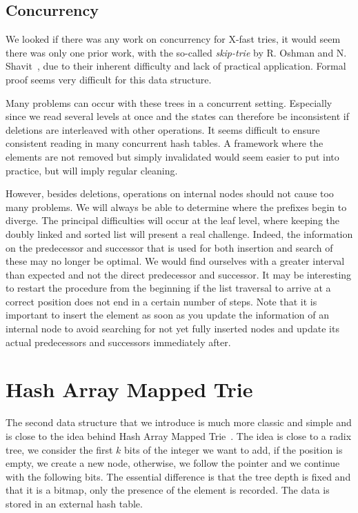 \documentclass[conference]{IEEEtran}
\begin{document}
\subsection{Concurrency}

We looked if there was any work on concurrency for X-fast tries, it would seem there was only one prior work, with the so-called \textit{skip-trie} by R. Oshman and N. Shavit~\cite{oshman2013skiptrie}, due to their inherent difficulty and lack of practical application. Formal proof seems very difficult for this data structure.

Many problems can occur with these trees in a concurrent setting. Especially since we read several levels at once and the states can therefore be inconsistent if deletions are interleaved with other operations. It seems difficult to ensure consistent reading in many concurrent hash tables. A framework where the elements are not removed but simply invalidated would seem easier to put into practice, but will imply regular cleaning.

However, besides deletions, operations on internal nodes should not cause too many problems. We will always be able to determine where the prefixes begin to diverge. The principal difficulties will occur at the leaf level, where keeping the doubly linked and sorted list will present a real challenge. Indeed, the information on the predecessor and successor that is used for both insertion and search of these may no longer be optimal. We would find ourselves with a greater interval than expected and not the direct predecessor and successor. It may be interesting to restart the procedure from the beginning if the list traversal to arrive at a correct position does not end in a certain number of steps. Note that it is important to insert the element as soon as you update the information of an internal node to avoid searching for not yet fully inserted nodes and update its actual predecessors and successors immediately after.

\section{Hash Array Mapped Trie}

The second data structure that we introduce is much more classic and simple and is close to the idea behind Hash Array Mapped Trie~\cite{bagwell2001ideal}. The idea is close to a radix tree, we consider the first $k$ bits of the integer we want to add, if the position is empty, we create a new node, otherwise, we follow the pointer and we continue with the following bits. The essential difference is that the tree depth is fixed and that it is a bitmap, only the presence of the element is recorded. The data is stored in an external hash table.
\end{document}
